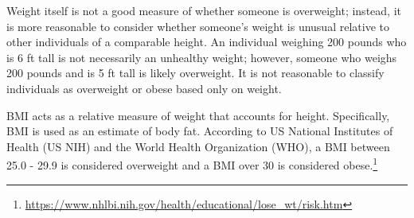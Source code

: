 \begin{example}
Weight itself is not a good measure of whether someone is overweight; instead, it is more reasonable to consider whether someone's weight is unusual relative to other individuals of a comparable height. An individual weighing 200 pounds who is 6 ft tall is not necessarily an unhealthy weight; however, someone who weighs 200 pounds and is 5 ft tall is likely overweight. It is not reasonable to classify individuals as overweight or obese based only on weight.

BMI acts as a relative measure of weight that accounts for height. Specifically, BMI is used as an estimate of body fat. According to US National Institutes of Health (US NIH) and the World Health Organization (WHO), a BMI between 25.0 - 29.9 is considered overweight and a BMI over 30 is considered obese.\footnote{\url{https://www.nhlbi.nih.gov/health/educational/lose\_wt/risk.htm}}
	
\end{example}



